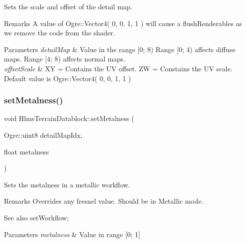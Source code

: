 Sets the scale and offset of the detail map. \begin{DoxyRemark}{Remarks}
A value of Ogre\+::\+Vector4( 0, 0, 1, 1 ) will cause a flush\+Renderables as we remove the code from the shader. 
\end{DoxyRemark}

\begin{DoxyParams}{Parameters}
{\em detail\+Map} & Value in the range \mbox{[}0; 8) Range \mbox{[}0; 4) affects diffuse maps. Range \mbox{[}4; 8) affects normal maps. \\
\hline
{\em offset\+Scale} & XY = Contains the UV offset. ZW = Constains the UV scale. Default value is Ogre\+::\+Vector4( 0, 0, 1, 1 ) \\
\hline
\end{DoxyParams}
\mbox{\label{class_hlms_terrain_datablock_acd5e39eb1968ddda8f05d5537fe3f945}} 
\subsubsection{\texorpdfstring{set\+Metalness()}{setMetalness()}}
{\footnotesize\ttfamily void Hlms\+Terrain\+Datablock\+::set\+Metalness (\begin{DoxyParamCaption}\item[{Ogre\+::uint8}]{detail\+Map\+Idx,  }\item[{float}]{metalness }\end{DoxyParamCaption})}

Sets the metalness in a metallic workflow. \begin{DoxyRemark}{Remarks}
Overrides any fresnel value. Should be in Metallic mode. 
\end{DoxyRemark}
\begin{DoxySeeAlso}{See also}
set\+Workflow; 
\end{DoxySeeAlso}

\begin{DoxyParams}{Parameters}
{\em metalness} & Value in range \mbox{[}0; 1\mbox{]} \\
\hline
\end{DoxyParams}
\mbox{\label{class_hlms_terrain_datablock_a4e7f40cdd79957bdbfbfd77ecd511c9a}} 
